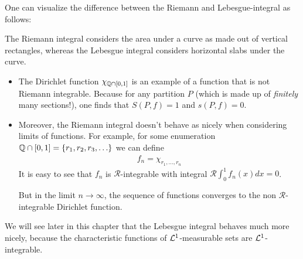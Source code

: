 One can visualize the difference between the Riemann and Lebesgue-integral as follows:
\begin{center}
The Riemann integral considers the area under a curve as made out of vertical rectangles,
whereas the Lebesgue integral considers horizontal slabs under the curve.
\end{center}

\begin{ex}[]
  \begin{itemize}
    \item 
      The Dirichlet function $\chi_{\mathbb{Q} \cap [0,1]}$ is an example of a function that is not Riemann integrable.
      Because for any partition $P$ (which is made up of \emph{finitely} many sections!), one finds that $S(P,f) = 1$ and $s(P,f) = 0$.

    \item Moreover, the Riemann integral doesn't behave as nicely when considering limits of functions.
      For example, for some enumeration $\mathbb{Q} \cap [0,1] = \{r_1,r_2,r_3,\ldots\}$ we can define
      \begin{align*}
        f_n = \chi_{r_1,\ldots,r_n}
      \end{align*}
      It is easy to see that $f_n$ is $\mathcal{R}$-integrable with integral $\mathcal{R} \int_0^{1}f_n(x) dx = 0$.

      But in the limit $n \to \infty$, the sequence of functions converges to the non $\mathcal{R}$-integrable Dirichlet function.
  \end{itemize}

  We will see later in this chapter that the Lebesgue integral behaves much more nicely, 
  because the characteristic functions of $\mathcal{L}^{1}$-measurable sets are $\mathcal{L}^{1}$-integrable.
\end{ex}



